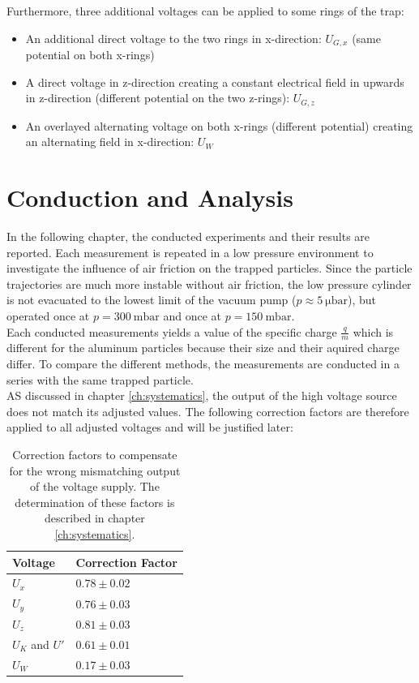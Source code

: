 \documentclass[
	paper=A4,
	parskip=full,
	chapterprefix=true,
	11pt,
	headings=normal,
	bibliography=totoc,
	listof=totoc,
	titlepage=on,
]{scrreprt}
\begin{document}
Furthermore, three additional voltages can be applied to some rings of the trap:
\begin{itemize}
	\item An additional direct voltage to the two rings in x-direction: $U_{G,x}$ (same potential on both x-rings)
	\item A direct voltage in z-direction creating a constant electrical field in upwards in z-direction (different potential on the two z-rings): $U_{G,z}$
	\item An overlayed alternating voltage on both x-rings (different potential) creating an alternating field in x-direction: $U_W$
\end{itemize}





\chapter{Conduction and Analysis}
\label{ch:analysis}
In the following chapter, the conducted experiments and their results are reported. Each measurement is repeated in a low pressure environment to investigate the influence of air friction on the trapped particles. Since the particle trajectories are much more instable without air friction, the low pressure cylinder is not evacuated to the lowest limit of the vacuum pump ($p \approx \SI{5}{\micro \bar}$), but operated once at $p = \SI{300}{\milli \bar}$ and once at $p = \SI{150}{\milli \bar}$. \\
Each conducted measurements yields a value of the specific charge $\frac{q}{m}$ which is different for the aluminum particles because their size and their aquired charge differ. To compare the different methods, the measurements are conducted in a series with the same trapped particle.\\
AS discussed in chapter \ref{ch:systematics}, the output of the high voltage source does not match its adjusted values. The following correction factors are therefore applied to all adjusted voltages and will be justified later:

\begin{table}[htbp]
	\centering
	\begin{tabular}{ 
			l
			l
		}
		\toprule
		Voltage & Correction Factor \\ 
		\midrule
		$U_x$ & $0.78 \pm 0.02$  \\
		$U_y$ & $0.76 \pm 0.03$ \\
		$U_z$ & $0.81 \pm 0.03$ \\
		$U_K$ and $U'$ & $0.61 \pm 0.01$ \\
		$U_W$ & $0.17 \pm 0.03$ \\
		
		\bottomrule
	\end{tabular}
	\caption{Correction factors to compensate for the wrong mismatching output of the voltage supply. The determination of these factors is described in chapter \ref{ch:systematics}.}
	\label{tbl:corr_factors}
\end{table}
\end{document}
